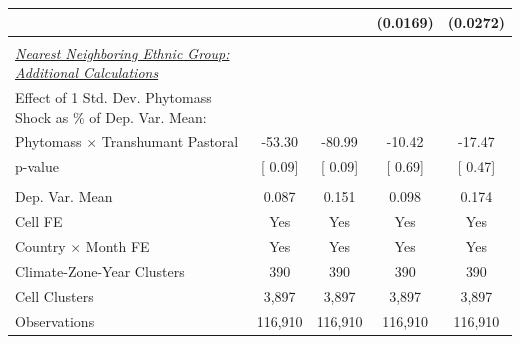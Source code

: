 {\begin{tabular}{l*{4}{c}}
                    &               &               &(0.0169)         &(0.0272)         \\
\midrule
\\ \underline{\emph{Nearest Neighboring Ethnic Group: Additional Calculations}} &               &               &               &               \\
[1em] Effect of 1 Std. Dev. Phytomass Shock as $\%$ of Dep. Var. Mean:&               &               &               &               \\
[1em] \hspace{15pt} Phytomass $\times$ Transhumant Pastoral&-53.30         &-80.99         &-10.42         &-17.47         \\
\hspace{15pt} p-value&[     0.09]         &[     0.09]         &[     0.69]         &[     0.47]         \\
\hline \\ Dep. Var. Mean& 0.087         & 0.151         & 0.098         & 0.174         \\
Cell FE             &   Yes         &   Yes         &   Yes         &   Yes         \\
Country $\times$ Month FE&   Yes         &   Yes         &   Yes         &   Yes         \\
Climate-Zone-Year Clusters&   390         &   390         &   390         &   390         \\
Cell Clusters       & 3,897         & 3,897         & 3,897         & 3,897         \\
Observations        &116,910         &116,910         &116,910         &116,910         \\
\bottomrule
\end{tabular}
}

